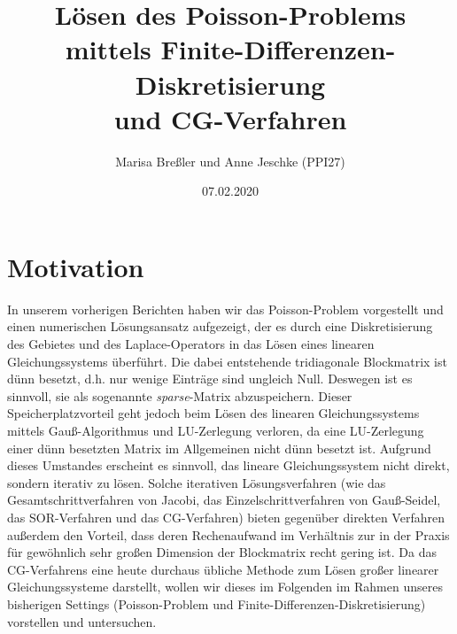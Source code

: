 \documentclass{scrartcl}
\begin{document}
\title{Lösen des Poisson-Problems mittels Finite-Differenzen-Diskretisierung\\
und CG-Verfahren}
\author{Marisa Breßler und Anne Jeschke (PPI27)}
\date{07.02.2020}
\maketitle

\tableofcontents

\pagebreak
\section{Motivation}
In unserem vorherigen Berichten haben wir das Poisson-Problem vorgestellt und einen numerischen Lösungsansatz aufgezeigt, der es durch eine Diskretisierung des Gebietes und des Laplace-Operators in das Lösen eines linearen Gleichungssystems überführt.
Die dabei entstehende tridiagonale Blockmatrix ist dünn besetzt, d.h. nur wenige Einträge sind ungleich Null.
Deswegen ist es sinnvoll, sie als sogenannte \textit{sparse}-Matrix abzuspeichern.
Dieser Speicherplatzvorteil geht jedoch beim Lösen des linearen Gleichungssystems mittels Gauß-Algorithmus und LU-Zerlegung verloren, da eine LU-Zerlegung einer dünn besetzten Matrix im Allgemeinen nicht dünn besetzt ist.
Aufgrund dieses Umstandes erscheint es sinnvoll, das lineare Gleichungssystem nicht direkt, sondern iterativ zu lösen.
Solche iterativen Lösungsverfahren (wie das Gesamtschrittverfahren von Jacobi, das Einzelschrittverfahren von Gauß-Seidel, das SOR-Verfahren und das CG-Verfahren) bieten gegenüber direkten Verfahren außerdem den Vorteil, dass deren Rechenaufwand im Verhältnis zur in der Praxis für gewöhnlich sehr großen Dimension der Blockmatrix recht gering ist.
Da das CG-Verfahrens eine heute durchaus übliche Methode zum Lösen großer linearer Gleichungssysteme darstellt, wollen wir dieses im Folgenden im Rahmen unseres bisherigen Settings (Poisson-Problem und Finite-Differenzen-Diskretisierung) vorstellen und untersuchen.



\pagebreak
\end{document}
